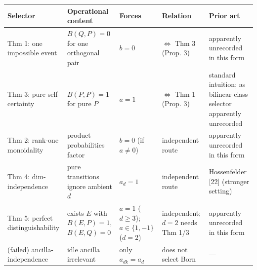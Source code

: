 \documentclass[
]{article}
\begin{document}
\begin{longtable}[]{@{}
  >{\raggedright\arraybackslash}p{}
  >{\raggedright\arraybackslash}p{}
  >{\raggedright\arraybackslash}p{}
  >{\raggedright\arraybackslash}p{}
  >{\raggedright\arraybackslash}p{}@{}}
\toprule\noalign{}
\begin{minipage}[b]{\linewidth}\raggedright
Selector
\end{minipage} & \begin{minipage}[b]{\linewidth}\raggedright
Operational content
\end{minipage} & \begin{minipage}[b]{\linewidth}\raggedright
Forces
\end{minipage} & \begin{minipage}[b]{\linewidth}\raggedright
Relation
\end{minipage} & \begin{minipage}[b]{\linewidth}\raggedright
Prior art
\end{minipage} \\
\midrule\noalign{}
\endhead
\bottomrule\noalign{}
\endlastfoot
Thm 1: one impossible event & \(B(Q,P)=0\) for one orthogonal pair &
\(b=0\) & \(\Leftrightarrow\) Thm 3 (Prop. 3) & apparently unrecorded in
this form \\
Thm 3: pure self-certainty & \(B(P,P)=1\) for pure \(P\) & \(a=1\) &
\(\Leftrightarrow\) Thm 1 (Prop. 3) & standard intuition; as
bilinear-class selector apparently unrecorded \\
Thm 2: rank-one monoidality & product probabilities factor & \(b=0\) (if
\(a\neq 0\)) & independent route & apparently unrecorded in this form \\
Thm 4: dim-independence & pure transitions ignore ambient \(d\) &
\(a_d=1\) & independent route & Hossenfelder {[}22{]} (stronger
setting) \\
Thm 5: perfect distinguishability & exists \(E\) with \(B(E,P)=1\),
\(B(E,Q)=0\) & \(a=1\) (\(d\geq 3\)); \(a\in\{1,-1\}\) (\(d=2\)) &
independent; \(d=2\) needs Thm 1/3 & apparently unrecorded in this
form \\
(failed) ancilla-independence & idle ancilla irrelevant & only
\(a_{dk}=a_d\) & does not select Born & --- \\
\end{longtable}
\end{document}
